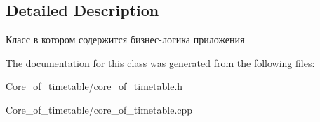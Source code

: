 \subsection{Detailed Description}
Класс в котором содержится бизнес-\/логика приложения 

The documentation for this class was generated from the following files\+:\begin{DoxyCompactItemize}
\item 
Core\+\_\+of\+\_\+timetable/core\+\_\+of\+\_\+timetable.\+h\item 
Core\+\_\+of\+\_\+timetable/core\+\_\+of\+\_\+timetable.\+cpp\end{DoxyCompactItemize}
